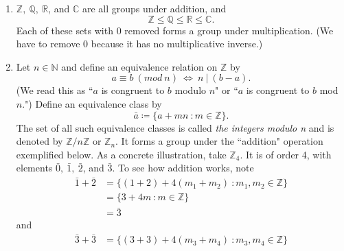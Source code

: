 \begin{example*}{}{}
\begin{enumerate}
  \item $\mathbb{Z},\ \mathbb{Q},\ \mathbb{R}$, and $\mathbb{C}$ are all groups
        under addition, and
        \begin{equation}
          \mathbb{Z} \leq \mathbb{Q} \leq \mathbb{R} \leq \mathbb{C}.
        \end{equation}
        Each of these sets with 0 removed forms a group under
        multiplication. (We have to remove 0 because it has no multiplicative
        inverse.)
  \item Let $n\in \mathbb{N}$ and define an equivalence relation on 
        $\mathbb{Z}$ by 
        \begin{equation}
          a\equiv b\ (mod\ n)\ \Leftrightarrow\ n\ |\ (b-a).
        \end{equation}
        (We read this as ``$a$ is congruent to $b$ modulo $ n$" or ``$a$ is
        congruent to $b$ mod $n$.") Define an equivalence class by 
        \begin{equation}
          \bar{a}\coloneqq\{a+mn\ : m\in \mathbb{Z}\}.
        \end{equation}
        The set of all such equivalence classes is called {\it the integers 
        modulo n} and is denoted by 
        $\mathbb{Z}/n\mathbb{Z}$ or $\mathbb{Z}_n$. It forms a group 
        under the ``addition" operation exemplified below. As a concrete 
        illustration, take $\mathbb{Z}_4$. It is of order 4, with 
        elements $\bar{0},\ \bar{1},\ \bar{2}$, and $\bar{3}$. To see how 
        addition works, note
        \begin{equation}
          \label{eq:chgtmaad1}
          \begin{aligned}
            \bar{1}+\bar{2}&=\{(1+2)+4(m_{1}+m_{2})\ : m_{1},m_{2}
                             \in \mathbb{Z}\}\\
                         &=\{3+4m\ : m\in \mathbb{Z}\}\\
                         &=\bar{3}
          \end{aligned}
        \end{equation}
        and
        \begin{equation}
          \label{eq:chgtmaad2}
          \begin{aligned}
            \bar{3}+\bar{3}&=\{(3+3)+4(m_{3}+m_{4})\ : m_{3},m_{4}
                             \in \mathbb{Z}\}\\

\end{aligned}
\end{equation}
\end{enumerate}
\end{example*}
